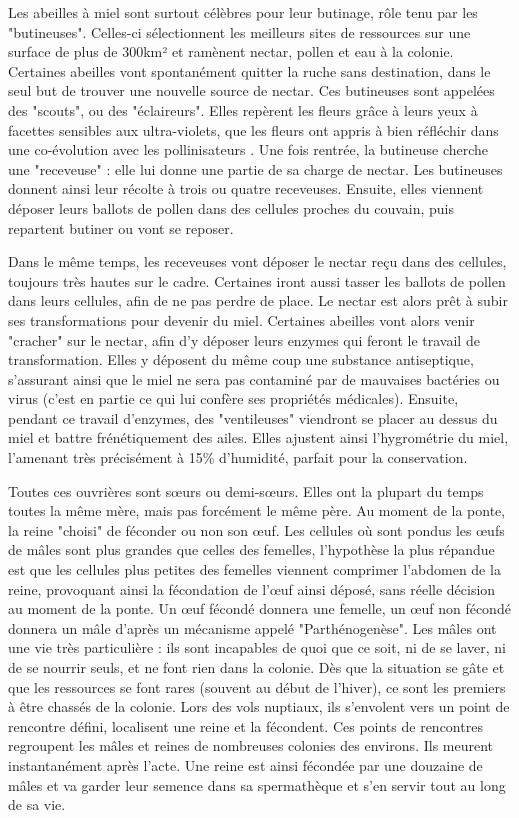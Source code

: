 			
			Les abeilles à miel sont surtout célèbres pour leur butinage, rôle tenu par les "butineuses". Celles-ci sélectionnent les meilleurs sites de ressources sur une surface de plus de 300km² \cite{riviere_modemulti-agent_2021} et ramènent nectar, pollen et eau à la colonie. Certaines abeilles vont spontanément quitter la ruche sans destination, dans le seul but de trouver une nouvelle source de nectar. Ces butineuses sont appelées des "scouts", ou des "éclaireurs". Elles repèrent les fleurs grâce à leurs yeux à facettes sensibles aux ultra-violets, que les fleurs ont appris à bien réfléchir dans une co-évolution avec les pollinisateurs \cite{thompson_concepts_1989}. Une fois rentrée, la butineuse cherche une "receveuse" : elle lui donne une partie de sa charge de nectar. Les butineuses donnent ainsi leur récolte à trois ou quatre receveuses. Ensuite, elles viennent déposer leurs ballots de pollen dans des cellules proches du couvain, puis repartent butiner ou vont se reposer. 
			
			Dans le même temps, les receveuses vont déposer le nectar reçu dans des cellules, toujours très hautes sur le cadre. Certaines iront aussi tasser les ballots de pollen dans leurs cellules, afin de ne pas perdre de place. Le nectar est alors prêt à subir ses transformations pour devenir du miel. Certaines abeilles vont alors venir "cracher" sur le nectar, afin d'y déposer leurs enzymes qui feront le travail de transformation. Elles y déposent du même coup une substance antiseptique, s'assurant ainsi que le miel ne sera pas contaminé par de mauvaises bactéries ou virus (c'est en partie ce qui lui confère ses propriétés médicales). Ensuite, pendant ce travail d'enzymes, des "ventileuses" viendront se placer au dessus du miel et battre frénétiquement des ailes. Elles ajustent ainsi l'hygrométrie du miel, l'amenant très précisément à 15\% d'humidité, parfait pour la conservation.
			
			Toutes ces ouvrières sont sœurs ou demi-sœurs. Elles ont la plupart du temps toutes la même mère, mais pas forcément le même père. Au moment de la ponte, la reine "choisi" de féconder ou non son œuf. Les cellules où sont pondus les œufs de mâles sont plus grandes que celles des femelles, l'hypothèse la plus répandue est que les cellules plus petites des femelles viennent comprimer l'abdomen de la reine, provoquant ainsi la fécondation de l'œuf ainsi déposé, sans réelle décision au moment de la ponte. Un œuf fécondé donnera une femelle, un œuf non fécondé donnera un mâle d'après un mécanisme appelé "Parthénogenèse". 
			Les mâles ont une vie très particulière : ils sont incapables de quoi que ce soit, ni de se laver, ni de se nourrir seuls, et ne font rien dans la colonie. Dès que la situation se gâte et que les ressources se font rares (souvent au début de l'hiver), ce sont les premiers à être chassés de la colonie. Lors des vols nuptiaux, ils s'envolent vers un point de rencontre défini, localisent une reine et la fécondent. Ces points de rencontres regroupent les mâles et reines de nombreuses colonies des environs. Ils meurent instantanément après l'acte. Une reine est ainsi fécondée par une douzaine de mâles et va garder leur semence dans sa spermathèque et s'en servir tout au long de sa vie.
			
